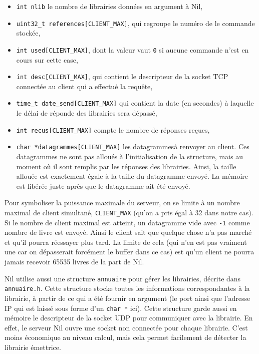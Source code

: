 \documentclass[10pt,a4paper]{article}
\renewcommand{\ss}{\vspace{\baselineskip}}
\begin{document}
\begin{multicols}{2}
\begin{itemize}
	\item \texttt{int nlib} le nombre de librairies données en argument à Nil,
	\item \texttt{uint32\_t references[CLIENT\_MAX]}, qui regroupe le numéro de le commande stockée,
	\item \texttt{int used[CLIENT\_MAX]}, dont la valeur vaut \texttt{0} si aucune commande n'est en cours sur cette case,
	\item \texttt{int desc[CLIENT\_MAX]}, qui contient le descripteur de la socket TCP connectée au client qui a effectué la requête,
	\item \texttt{time\_t date\_send[CLIENT\_MAX]} qui contient la date (en secondes) à laquelle le délai de réponde des librairies sera dépassé,
	\item \texttt{int recus[CLIENT\_MAX]} compte le nombre de réponses reçues,
	\item \texttt{char *datagrammes[CLIENT\_MAX]} les datagrammes\linebreak à renvoyer au client. Ces datagrammes ne sont pas alloués à l'initialisation de la structure, mais au moment où il sont remplis par les réponses des librairies. Ainsi, la taille allouée est exactement égale à la taille du datagramme envoyé. La mémoire est libérée juste après que le datagramme ait été envoyé.
\end{itemize}



Pour symboliser la puissance maximale du serveur, on se limite à un nombre maximal de client simultané, \texttt{CLIENT\_MAX} (qu'on a pris égal à 32 dans notre cas). Si le nombre de client maximal est atteint, un datagramme vide avec \texttt{-1} comme nombre de livre est envoyé. Ainsi le client sait que quelque chose n'a pas marché et qu'il pourra réessayer plus tard. La limite de cela (qui n'en est pas vraiment une car on dépasserait forcément le buffer dans ce cas) est qu'un client ne pourra jamais recevoir 65535 livres de la part de Nil.


\ss

Nil utilise aussi une structure \texttt{annuaire} pour gérer les librairies, décrite dans \texttt{annuaire.h}. Cette structure stocke toutes les informations correspondantes à la librairie, à partir de ce qui a été fournir en argument (le port ainsi que l'adresse IP qui est laissé sous forme d'un \texttt{char *} ici). Cette structure garde aussi en mémoire le descripteur de la socket UDP pour communiquer avec la librairie. En effet, le serveur Nil ouvre une socket non connectée pour chaque librairie. C'est moins économique au niveau calcul, mais cela permet facilement de détecter la librairie émettrice.



\end{multicols}
\end{document}
